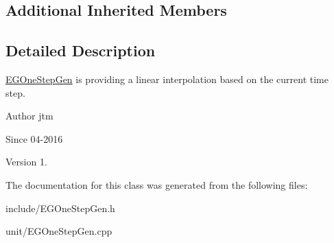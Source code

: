 \subsection*{Additional Inherited Members}


\subsection{Detailed Description}
\hyperlink{classunit_1_1EGOneStepGen}{E\-G\-One\-Step\-Gen} is providing a linear interpolation based on the current time step.

\begin{DoxyAuthor}{Author}
jtm 
\end{DoxyAuthor}
\begin{DoxySince}{Since}
04-\/2016 
\end{DoxySince}
\begin{DoxyVersion}{Version}
1. 
\end{DoxyVersion}


The documentation for this class was generated from the following files\-:\begin{DoxyCompactItemize}
\item 
include/E\-G\-One\-Step\-Gen.\-h\item 
unit/E\-G\-One\-Step\-Gen.\-cpp\end{DoxyCompactItemize}
